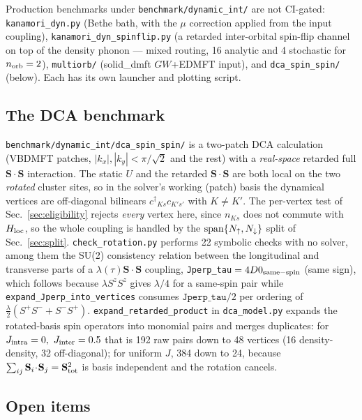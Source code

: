 \documentclass[a4paper,12pt]{article}
\renewcommand{\t}{\ensuremath{\tau}}
\newcommand{\Hloc}{\ensuremath{H_{\rm loc}}}
\newcommand{\ndag}{\ensuremath{^\dagger}}
\begin{document}
Production benchmarks under \texttt{benchmark/dynamic\_int/} are not CI-gated:
\texttt{kanamori\_dyn.py} (Bethe bath, with the $\mu$ correction applied from the input
coupling), \texttt{kanamori\_dyn\_spinflip.py} (a retarded inter-orbital spin-flip channel
on top of the density phonon --- mixed routing, 16 analytic and 4 stochastic for
$n_{\rm orb}=2$), \texttt{multiorb/} (solid\_dmft $GW$+EDMFT input), and
\texttt{dca\_spin\_spin/} (below). Each has its own launcher and plotting script.

\subsection{The DCA benchmark}

\texttt{benchmark/dynamic\_int/dca\_spin\_spin/} is a two-patch DCA calculation (VBDMFT
patches, $|k_x|,|k_y|<\pi/\sqrt2$ and the rest) with a \emph{real-space} retarded full
$\mathbf S\!\cdot\!\mathbf S$ interaction. The static $U$ and the retarded
$\mathbf S\!\cdot\!\mathbf S$ are both local on the two \emph{rotated} cluster sites, so in
the solver's working (patch) basis the dynamical vertices are off-diagonal bilinears
$c\ndag_{Ks}c_{K's'}$ with $K\neq K'$. The per-vertex test of Sec.~\ref{sec:eligibility}
rejects \emph{every} vertex here, since $n_{Ks}$ does not commute with $\Hloc$, so the
whole coupling is handled by the ${\rm span}\{N_\uparrow,N_\downarrow\}$ split of
Sec.~\ref{sec:split}. \texttt{check\_rotation.py} performs 22 symbolic checks with no
solver, among them the SU(2) consistency relation between the longitudinal and transverse
parts of a $\lambda(\t)\mathbf S\!\cdot\!\mathbf S$ coupling,
\texttt{Jperp\_tau}${}=4D0_{\rm same-spin}$ (same sign), which follows because
$\lambda S^zS^z$ gives $\lambda/4$ for a same-spin pair while
\texttt{expand\_Jperp\_into\_vertices} consumes $\texttt{Jperp\_tau}/2$ per ordering of
$\tfrac\lambda2(S^+S^-+S^-S^+)$. \texttt{expand\_retarded\_product} in \texttt{dca\_model.py}
expands the rotated-basis spin operators into monomial pairs and merges duplicates: for
$J_{\rm intra}=0,\ J_{\rm inter}=0.5$ that is 192 raw pairs down to 48 vertices (16
density-density, 32 off-diagonal); for uniform $J$, 384 down to 24, because
$\sum_{ij}\mathbf S_i\!\cdot\!\mathbf S_j=\mathbf S_{\rm tot}^2$ is basis independent and
the rotation cancels.

\subsection{Open items}
\end{document}
